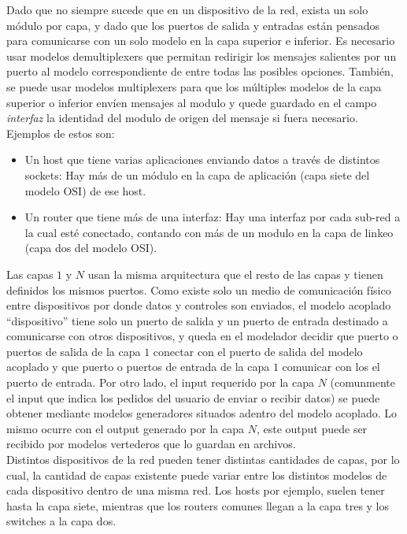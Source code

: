 \documentclass[10pt,a4paper]{article}
\begin{document}
Dado que no siempre sucede que en un dispositivo de la red, exista un solo módulo por capa, y dado que los puertos de salida y entradas están pensados para comunicarse con un solo modelo en la capa superior e inferior. Es necesario usar modelos demultiplexers que permitan redirigir los mensajes salientes por un puerto al modelo correspondiente de entre todas las posibles opciones. También, se puede usar modelos multiplexers para que los múltiples modelos de la capa superior o inferior envíen mensajes al modulo y quede guardado en el campo \textit{interfaz} la identidad del modulo de origen del mensaje si fuera necesario. \\

Ejemplos de estos son: 
\begin{itemize}
\item Un host que tiene varias aplicaciones enviando datos a través de distintos sockets: Hay más de un módulo en la capa de aplicación (capa siete del modelo OSI) de ese host.
\item  Un router que tiene más de una interfaz: Hay una interfaz por cada sub-red a la cual esté conectado, contando con más de un modulo en la capa de linkeo (capa dos del modelo OSI).
\end{itemize}

Las capas $1$ y $N$ usan la misma arquitectura que el resto de las capas y tienen definidos los mismos puertos. Como existe solo un medio de comunicación físico entre dispositivos por donde datos y controles son enviados, el modelo acoplado ``dispositivo'' tiene solo un puerto de salida y un puerto de entrada destinado a comunicarse con otros dispositivos, y queda en el modelador decidir que puerto o puertos de salida de la capa $1$ conectar con el puerto de salida del modelo acoplado y que puerto o puertos de entrada de la capa $1$ comunicar con los el puerto de entrada. Por otro lado, el input requerido por la capa $N$ (comunmente el input que indica los pedidos del usuario de enviar o recibir datos) se puede obtener mediante modelos generadores situados adentro del modelo acoplado. Lo mismo ocurre con el output generado por la capa $N$, este output puede ser recibido por modelos vertederos que lo guardan en archivos. \\

Distintos dispositivos de la red pueden tener distintas cantidades de capas, por lo cual, la cantidad de capas existente puede variar entre los distintos modelos de cada dispositivo dentro de una misma red. Los hosts por ejemplo, suelen tener hasta la capa siete, mientras que los routers comunes llegan a la capa tres y los switches a la capa dos. \\
\end{document}
